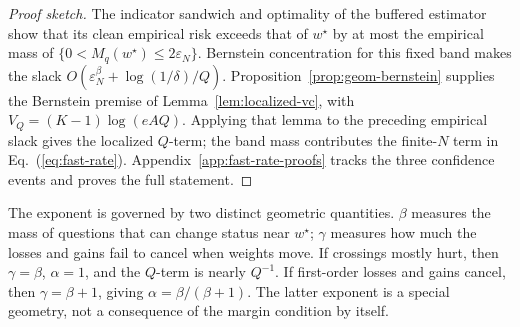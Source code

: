 \begin{proof}[Proof sketch]
The indicator sandwich and optimality of the buffered estimator show that its
clean empirical risk exceeds that of \(w^\star\) by at most the empirical mass
of \(\{0<M_q(w^\star)\le2\varepsilon_N\}\).  Bernstein concentration for this
fixed band makes the slack
\(O(\varepsilon_N^\beta+\log(1/\delta)/Q)\).
Proposition~\ref{prop:geom-bernstein} supplies the Bernstein premise of
Lemma~\ref{lem:localized-vc}, with
\(V_Q=(K-1)\log(eAQ)\).  Applying that lemma to the preceding empirical slack
gives the localized \(Q\)-term; the band mass contributes the finite-\(N\)
term in Eq.~(\ref{eq:fast-rate}).  Appendix~\ref{app:fast-rate-proofs} tracks
the three confidence events and proves the full statement.
\end{proof}

The exponent is governed by two distinct geometric quantities.  \(\beta\)
measures the mass of questions that can change status near \(w^\star\);
\(\gamma\) measures how much the losses and gains fail to cancel when weights
move.  If crossings mostly hurt, then \(\gamma=\beta\), \(\alpha=1\), and the
\(Q\)-term is nearly \(Q^{-1}\).  If first-order losses and gains cancel, then
\(\gamma=\beta+1\), giving
\(\alpha=\beta/(\beta+1)\).  The latter exponent is a special geometry, not a
consequence of the margin condition by itself.
